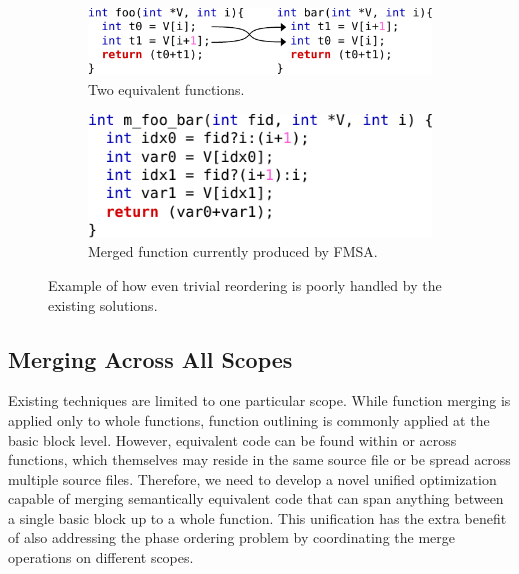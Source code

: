 \begin{figure}[h]
 \centering
 \begin{subfigure}{.5\textwidth}
         \centering
         \includegraphics[scale=0.85]{src/conclusion/figs/motivation-1-code.pdf}
         \vspace{1ex}
         \caption{Two equivalent functions.}
         \label{fig:code-reordering}
 \end{subfigure}\begin{subfigure}{.5\textwidth}
         \centering
         \includegraphics[scale=0.85]{src/conclusion/figs/motivation-1-merged-code.pdf}
         \caption{Merged function currently produced by FMSA.}
         \label{fig:merged-code-reordering}
 \end{subfigure}
    \vspace{-2ex}
    \caption{Example of how even trivial reordering is poorly handled by the existing solutions.}
    \label{fig:code-reordering-example}
\end{figure}

\subsection{Merging Across All Scopes}

Existing techniques are limited to one particular scope.
While function merging is applied only to whole functions,
function outlining is commonly applied at the basic block level.
However, equivalent code can be found within or across functions, which themselves may reside in the same source file or be spread across multiple source files.
Therefore, we need to develop a novel unified optimization capable of merging semantically equivalent code that can span anything between a single basic block up to a whole function.
This unification has the extra benefit of also addressing the phase ordering problem by coordinating the merge operations on different scopes.

